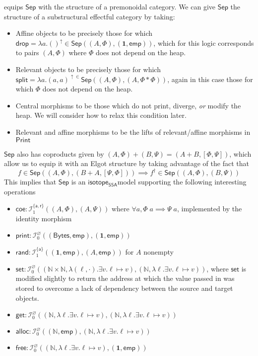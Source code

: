 \documentclass[acmsmall,screen,review]{acmart}
\newcommand{\mc}[1]{\ensuremath{\mathcal{#1}}}
\newcommand{\mb}[1]{\ensuremath{\mathbf{#1}}}
\newcommand{\ms}[1]{\ensuremath{\mathsf{#1}}}
\newcommand{\nats}{\mathbb{N}}
\newcommand{\taff}{{\{\ms{a}\}}}
\newcommand{\tint}{{\{\ms{a}, \ms{r}\}}}
\newcommand{\upg}[2]{{#1}^{\uparrow #2}}
\newcommand{\isotopessa}{\ms{isotope_{SSA}}}
\begin{document}
equips \(\ms{Sep}\) with the structure of a premonoidal category. We can give \(\ms{Sep}\) the structure of a substructural effectful category by taking:
\begin{itemize}
  \item Affine objects to be precisely those for which \(\ms{drop} =
  \upg{\lambda a. ()}{} \in \ms{Sep}((A, \Phi), (\mb{1}, \ms{emp}))\), which for
  this logic corresponds to pairs \((A, \Phi)\) where \(\Phi\) does not depend
  on the heap.
  \item Relevant objects to be precisely those for which \(\ms{split} =
  \upg{\lambda a. (a, a)} \in \ms{Sep}((A, \Phi), (A, \Phi * \Phi))\), again in
  this case those for which \(\Phi\) does not depend on the heap.
  \item Central morphisms to be those which do not print, diverge, \textit{or} modify the
  heap. We will consider how to relax this condition later.
  \item Relevant and affine morphisms to be the lifts of relevant/affine morphisms in \(\ms{Print}\)
\end{itemize}
\(\ms{Sep}\) also has coproducts given by \((A, \Phi) + (B, \Psi) = (A + B, [\Phi, \Psi])\), which allow us to equip it with an Elgot structure by taking advantage of the fact that
\begin{equation}
  f \in \ms{Sep}((A, \Phi), (B + A, [\Psi, \Phi])) \implies f^\dagger \in \ms{Sep}((A, \Phi), (B, \Psi))
\end{equation}
This implies that \(\ms{Sep}\) is an \isotopessa model supporting the following interesting operations
\begin{itemize}
  \item \(\ms{coe}: \mc{I}^\tint_1((A, \Phi), (A, \Psi))\) where \(\forall a,
  \Phi\;a \implies \Psi\;a\), implemented by the identity morphism
  \item \(\ms{print}: \mc{I}^\varnothing_0((\ms{Bytes}, \ms{emp}), (\mb{1},
  \ms{emp}))\)
  \item \(\ms{rand}: \mc{I}^\taff_1((\mb{1}, \ms{emp}), (A, \ms{emp}))\) for \(A\) nonempty
  \item \(\ms{set}: \mc{I}^\varnothing_0((\nats \times \nats, \lambda (\ell,
  \cdot). \exists v. \ell \mapsto v), (\nats, \lambda \ell. \exists v. \ell
  \mapsto v))\), where \(\ms{set}\) is modified slightly to return the address
  at which the value passed in was stored to overcome a lack of dependency
  between the source and target objects.
  \item \(\ms{get}: \mc{I}^\varnothing_0((\nats, \lambda \ell. \exists v. \ell \mapsto v), (\nats, \lambda \ell. \exists v. \ell \mapsto v))\)
  \item \(\ms{alloc}: \mc{I}^\varnothing_0((\nats, \ms{emp}), (\nats, \lambda
  \ell. \exists v. \ell \mapsto v))\)
  \item \(\ms{free}: \mc{I}^\varnothing_0((\nats, \lambda \ell. \exists v. \ell \mapsto v), (\mb{1}, \ms{emp}))\)
\end{itemize}
\end{document}
